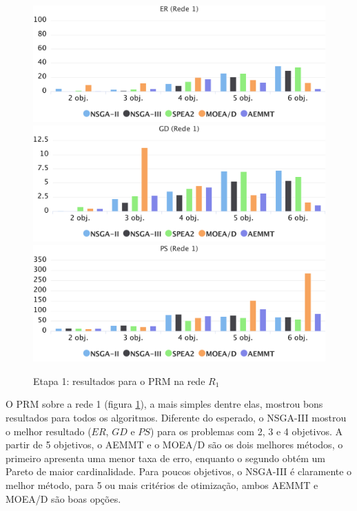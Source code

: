 \begin{figure}[!htbp]
	\caption{Etapa 1: resultados para o PRM na rede $R_1$}
	\label{fig_exp1_mrp_r1}
	\includegraphics[width=1\textwidth]{cap_experimentos/figs/etapa1/er-mrp-r1}
	\includegraphics[width=1\textwidth]{cap_experimentos/figs/etapa1/gd-mrp-r1}
	\includegraphics[width=1\textwidth]{cap_experimentos/figs/etapa1/ps-mrp-r1}
\end{figure}

O PRM sobre a rede 1 (figura \ref{fig_exp1_mrp_r1}), a mais simples dentre elas, mostrou bons resultados para todos os algoritmos. Diferente do esperado, o NSGA-III mostrou o melhor resultado ($ER$, $GD$ e $PS$) para os problemas com 2, 3 e 4 objetivos. A partir de 5 objetivos, o AEMMT e o MOEA/D são os dois melhores métodos, o primeiro apresenta uma menor taxa de erro, enquanto o segundo obtém um Pareto de maior cardinalidade. Para poucos objetivos, o NSGA-III é claramente o melhor método, para 5 ou mais critérios de otimização, ambos AEMMT e MOEA/D são boas opções.

